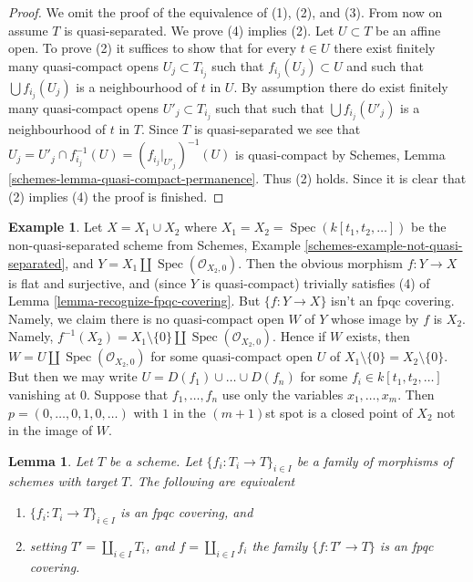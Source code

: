 \documentclass{stacks-project}
\theoremstyle{plain}
\newtheorem{lemma}[subsection]{Lemma}
\theoremstyle{definition}
\newtheorem{example}[subsection]{Example}
\theoremstyle{remark}
\numberwithin{equation}{subsection}
\def\Spec{\mathop{\mathrm{Spec}}}
\begin{document}
\begin{proof}
We omit the proof of the equivalence of (1), (2), and (3).
From now on assume $T$ is quasi-separated.
We prove (4) implies (2). Let $U \subset T$ be an affine open.
To prove (2) it suffices to show that for every $t \in U$ there exist
finitely many quasi-compact opens $U_j \subset T_{i_j}$ such that
$f_{i_j}(U_j) \subset U$ and such that $\bigcup f_{i_j}(U_j)$
is a neighbourhood of $t$ in $U$. By assumption there do exist
finitely many quasi-compact opens $U'_j \subset T_{i_j}$ such that
such that $\bigcup f_{i_j}(U'_j)$ is a neighbourhood of $t$ in $T$.
Since $T$ is quasi-separated we see that
$U_j = U'_j \cap f_{i_j}^{-1}(U) = (f_{i_j}|_{U'_j})^{-1}(U)$
is quasi-compact by
Schemes, Lemma \ref{schemes-lemma-quasi-compact-permanence}.
Thus (2) holds. Since it is clear that (2) implies
(4) the proof is finished.
\end{proof}

\begin{example}
\label{example-not-fpqc}
Let $X = X_1 \cup X_2$ where $X_1 = X_2 = \Spec(k[t_1,t_2,\dots])$
be the non-quasi-separated scheme from
Schemes, Example \ref{schemes-example-not-quasi-separated}, and
$Y = X_1 \amalg \Spec(\mathcal{O}_{X_2, 0})$.
Then the obvious morphism $f : Y \to X$
is flat and surjective, and (since $Y$ is quasi-compact)
trivially satisfies (4) of Lemma \ref{lemma-recognize-fpqc-covering}.
But $\{f : Y \to X\}$ isn't an fpqc covering. Namely, we claim there
is no quasi-compact open $W$ of $Y$ whose image by $f$ is $X_2$.
Namely, $f^{-1}(X_2) = X_1 \setminus \{0\} \amalg \Spec(\mathcal{O}_{X_2, 0})$.
Hence if $W$ exists, then $W = U \amalg \Spec(\mathcal{O}_{X_2, 0})$
for some quasi-compact open $U$ of $X_1 \setminus \{0\} = X_2 \setminus \{0\}$.
But then we may write $U = D(f_1) \cup \ldots \cup D(f_n)$ for
some $f_i \in k[t_1, t_2, \ldots]$ vanishing at $0$.
Suppose that $f_1, \ldots, f_n$ use only the variables
$x_1, \ldots, x_m$. Then $p = (0, \ldots, 0, 1, 0, \ldots)$ with $1$
in the $(m + 1)$st spot is a closed point of $X_2$ not in the image
of $W$.
\end{example}

\begin{lemma}
\label{lemma-disjoint-union-is-fpqc-covering}
Let $T$ be a scheme. Let $\{f_i : T_i \to T\}_{i \in I}$ be a family of
morphisms of schemes with target $T$. The following are equivalent
\begin{enumerate}
\item $\{f_i : T_i \to T\}_{i \in I}$ is an fpqc covering, and
\item setting $T' = \coprod_{i \in I} T_i$, and $f = \coprod_{i \in I} f_i$
the family $\{f : T' \to T\}$ is an fpqc covering.
\end{enumerate}
\end{lemma}
\end{document}
